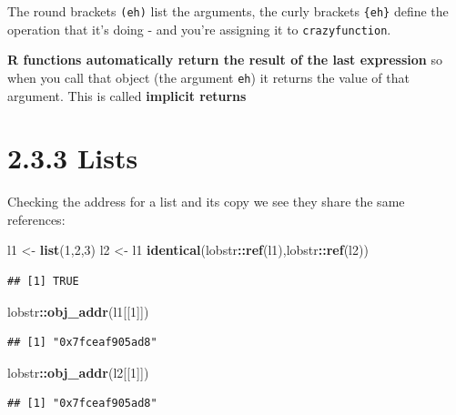 \documentclass[]{book}
\newenvironment{Shaded}{\begin{snugshade}}{\end{snugshade}}
\newcommand{\DecValTok}[1]{\textcolor[rgb]{0.00,0.00,0.81}{#1}}
\newcommand{\KeywordTok}[1]{\textcolor[rgb]{0.13,0.29,0.53}{\textbf{#1}}}
\newcommand{\NormalTok}[1]{#1}
\newcommand{\OperatorTok}[1]{\textcolor[rgb]{0.81,0.36,0.00}{\textbf{#1}}}
\newcommand{\StringTok}[1]{\textcolor[rgb]{0.31,0.60,0.02}{#1}}
\begin{document}
The round brackets \texttt{(eh)} list the arguments, the curly brackets \texttt{\{eh\}} define the operation that it's doing - and you're assigning it to \texttt{crazyfunction}.

\textbf{R functions automatically return the result of the last expression} so when you call that object (the argument \texttt{eh}) it returns the value of that argument. This is called \textbf{implicit returns}

\hypertarget{lists}{%
\section*{2.3.3 Lists}\label{lists}}

Checking the address for a list and its copy we see they share the same references:

\begin{Shaded}
\begin{Highlighting}[]
\NormalTok{l1 <-}\StringTok{ }\KeywordTok{list}\NormalTok{(}\DecValTok{1}\NormalTok{,}\DecValTok{2}\NormalTok{,}\DecValTok{3}\NormalTok{)}
\NormalTok{l2 <-}\StringTok{ }\NormalTok{l1}
\KeywordTok{identical}\NormalTok{(lobstr}\OperatorTok{::}\KeywordTok{ref}\NormalTok{(l1),lobstr}\OperatorTok{::}\KeywordTok{ref}\NormalTok{(l2))}
\end{Highlighting}
\end{Shaded}

\begin{verbatim}
## [1] TRUE
\end{verbatim}

\begin{Shaded}
\begin{Highlighting}[]
\NormalTok{lobstr}\OperatorTok{::}\KeywordTok{obj_addr}\NormalTok{(l1[[}\DecValTok{1}\NormalTok{]])}
\end{Highlighting}
\end{Shaded}

\begin{verbatim}
## [1] "0x7fceaf905ad8"
\end{verbatim}

\begin{Shaded}
\begin{Highlighting}[]
\NormalTok{lobstr}\OperatorTok{::}\KeywordTok{obj_addr}\NormalTok{(l2[[}\DecValTok{1}\NormalTok{]])}
\end{Highlighting}
\end{Shaded}

\begin{verbatim}
## [1] "0x7fceaf905ad8"
\end{verbatim}
\end{document}
